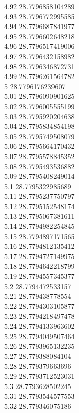 {4.92	28.7796858104289\\
4.93	28.7796772995585\\
4.94	28.7796687841977\\
4.95	28.7796602648218\\
4.96	28.7796517419006\\
4.97	28.7796432158982\\
4.98	28.7796346872731\\
4.99	28.7796261564782\\
5	28.7796176239607\\
5.01	28.7796090901625\\
5.02	28.7796005555199\\
5.03	28.7795920204638\\
5.04	28.7795834854198\\
5.05	28.7795749508079\\
5.06	28.7795664170432\\
5.07	28.7795578845352\\
5.08	28.7795493536882\\
5.09	28.7795408249014\\
5.1	28.7795322985689\\
5.11	28.7795237750797\\
5.12	28.7795152548174\\
5.13	28.7795067381611\\
5.14	28.7794982254845\\
5.15	28.7794897171565\\
5.16	28.7794812135412\\
5.17	28.7794727149975\\
5.18	28.7794642218799\\
5.19	28.7794557345377\\
5.2	28.7794472533157\\
5.21	28.779438778554\\
5.22	28.7794303105877\\
5.23	28.7794218497478\\
5.24	28.7794133963602\\
5.25	28.7794049507464\\
5.26	28.7793965132235\\
5.27	28.779388084104\\
5.28	28.779379663696\\
5.29	28.7793712523031\\
5.3	28.7793628502245\\
5.31	28.7793544577553\\
5.32	28.779346075186\\
}
